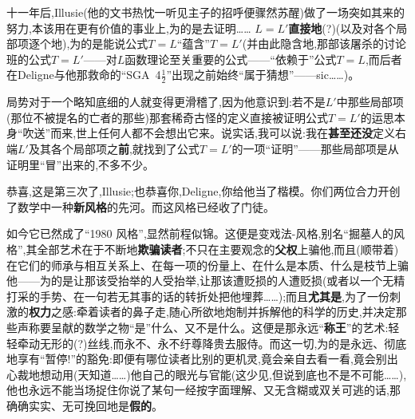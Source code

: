 十一年后,Illusie(他的文书热忱一听见主子的招呼便骤然苏醒)做了一场突如其来的努力,本该用在更有价值的事业上,为的是去证明……
$L = L'$\textbf{直接地}(?)(以及对各个局部项逐个地),为的是能说公式$T = L$“蕴含”$T = L'$(并由此隐含地,那部该屠杀的讨论班的公式$T = L'$——对$L$函数理论至关重要的公式——“依赖于”公式$T = L$,而后者在Deligne与他那救命的“SGA~4$\frac{1}{2}$”出现之前始终“属于猜想”——sic……)。

\dmark{}局势对于一个略知底细的人就变得更滑稽了,因为他意识到:若不是$L'$中那些局部项(那位不被提名的亡者的那些)那套稀奇古怪的定义直接被证明公式$T = L'$的运思本身“吹送”而来,世上任何人都不会想出它来。说实话,我可以说:我在\textbf{甚至还没}定义右端$L'$及其各个局部项之\textbf{前},就找到了公式$T = L'$的一项“证明”——那些局部项是从证明里“冒”出来的,不多不少。

恭喜,这是第三次了,Illusie;也恭喜你,Deligne,你给他当了楷模。你们两位合力开创了数学中一种\textbf{新风格}的先河。而这风格已经收了门徒。

如今它已然成了“1980 风格”,显然前程似锦。这便是变戏法-风格,别名“掘墓人的风格”,其全部艺术在于不断地\textbf{欺骗读者};不只在主要观念的\textbf{父权}上骗他,而且(顺带着)在它们的师承与相互关系上、在每一项的份量上、在什么是本质、什么是枝节上骗他——为的是让那该受抬举的人受抬举,让那该遭贬损的人遭贬损(或者以一个无精打采的手势、在一句若无其事的话的转折处把他埋葬……);而且\textbf{尤其是},为了一份刺激的\textbf{权力}之感:牵着读者的鼻子走,随心所欲地\dmark{}炮制并拆解他的科学的历史,并决定那些声称要呈献的数学之物“是”什么、又不是什么。这便是那永远“\textbf{称王}”的艺术:轻轻牵动无形的(?)丝线,而永不、永不纡尊降贵去服侍。而这一切,为的是永远、彻底地享有“暂停!”的豁免:即便有哪位读者比别的更机灵,竟会亲自去看一看,竟会别出心裁地想动用(天知道……)他自己的眼光与官能(这少见,但说到底也不是不可能……),他也永远不能当场捉住你说了某句一经按字面理解、又无含糊或双关可逃的话,那确确实实、无可挽回地是\textbf{假的}。

